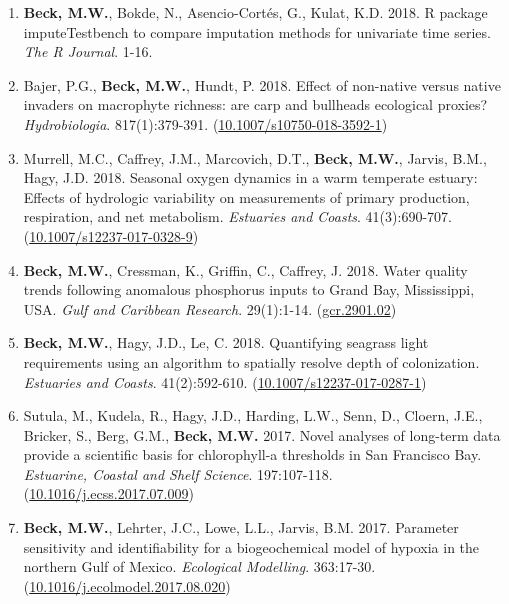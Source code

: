 \documentclass[letterpaper,12pt]{article}
\begin{document}
\begin{enumerate}
\item \textbf{Beck, M.W.}, Bokde, N., Asencio-Cort\'{e}s, G., Kulat, K.D. 2018. R package imputeTestbench to compare imputation methods for univariate time series. \textit{The R Journal}. 1-16.

\item Bajer, P.G., \textbf{Beck, M.W.}, Hundt, P. 2018. Effect of non-native versus native invaders on macrophyte richness: are carp and bullheads ecological proxies? \textit{Hydrobiologia}. 817(1):379-391. ({\footnotesize\href{https://link.springer.com/article/10.1007/s10750-018-3592-1}{10.1007/s10750-018-3592-1}})

\item Murrell, M.C., Caffrey, J.M., Marcovich, D.T., \textbf{Beck, M.W.}, Jarvis, B.M., Hagy, J.D. 2018. Seasonal oxygen dynamics in a warm temperate estuary: Effects of hydrologic variability on measurements of primary production, respiration, and net metabolism. \textit{Estuaries and Coasts}. 41(3):690-707. ({\footnotesize\href{https://link.springer.com/article/10.1007/s12237-017-0328-9}{10.1007/s12237-017-0328-9}})

\item \textbf{Beck, M.W.}, Cressman, K., Griffin, C., Caffrey, J. 2018. Water quality trends following anomalous phosphorus inputs to Grand Bay, Mississippi, USA. \textit{Gulf and Caribbean Research}. 29(1):1-14. ({\footnotesize\href{https://aquila.usm.edu/gcr/vol29/iss1/2/}{gcr.2901.02}})

\item \textbf{Beck, M.W.}, Hagy, J.D., Le, C. 2018. Quantifying seagrass light requirements using an algorithm to spatially resolve depth of colonization. \textit{Estuaries and Coasts}. 41(2):592-610. ({\footnotesize\href{http://dx.doi.org/10.1007/s12237-017-0287-1}{10.1007/s12237-017-0287-1}})

\item Sutula, M., Kudela, R., Hagy, J.D., Harding, L.W., Senn, D., Cloern, J.E., Bricker, S., Berg, G.M., \textbf{Beck, M.W.} 2017. Novel analyses of long-term data provide a scientific basis for chlorophyll-a thresholds in San Francisco Bay. \textit{Estuarine, Coastal and Shelf Science}. 197:107-118. ({\footnotesize\href{https://doi.org/10.1016/j.ecss.2017.07.009}{10.1016/j.ecss.2017.07.009}})

\item \textbf{Beck, M.W.}, Lehrter, J.C., Lowe, L.L., Jarvis, B.M. 2017. Parameter sensitivity and identifiability for a biogeochemical model of hypoxia in the northern Gulf of Mexico. \textit{Ecological Modelling}. 363:17-30. ({\footnotesize\href{http://dx.doi.org/10.1016/j.ecolmodel.2017.08.020}{10.1016/j.ecolmodel.2017.08.020}})


\end{enumerate}
\end{document}
